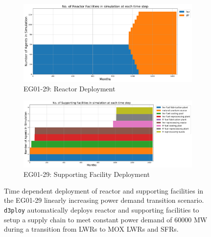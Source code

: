 \documentclass[11pt]{article}
\newcommand{\deploy}{\texttt{d3ploy}\xspace}%
\begin{document}
\begin{figure}[]
	\centering
	\begin{subfigure}[t]{1.2\textwidth}
		\centering
		\includegraphics[width=\linewidth]{29-figures/eg29-stack_reactor.png} 
		\caption{EG01-29: Reactor Deployment}
		\label{fig:29reactor}
	\end{subfigure}
	\vspace{1cm}
	\begin{subfigure}[t]{1.2\textwidth}
		\centering
		\includegraphics[width=\linewidth]{29-figures/eg29-stack_support.png} 
		\caption{EG01-29: Supporting Facility Deployment}
		\label{fig:29support}
	\end{subfigure}
	\hfill
	\caption{Time dependent deployment of reactor and supporting facilities in 
	the EG01-29 linearly increasing power demand transition scenario. 
	\deploy automatically deploys reactor and supporting facilities 
	to setup a supply chain to meet constant power demand of $60000$ MW
	during a transition from \glspl{LWR} to MOX LWRs and \glspl{SFR}. }
	\label{fig:29stack}
\end{figure}
\end{document}

